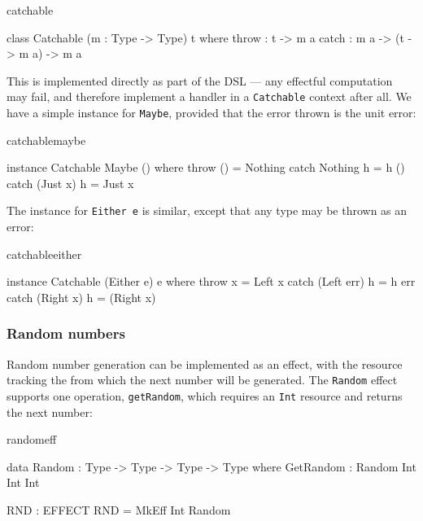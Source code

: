 \begin{SaveVerbatim}{catchable}

class Catchable (m : Type -> Type) t where
    throw : t -> m a
    catch : m a -> (t -> m a) -> m a

\end{SaveVerbatim}

\noindent
This is implemented directly as part of the \Eff{} DSL --- any effectful
computation may fail, and therefore implement a handler in a \texttt{Catchable}
context after all. We have a simple instance for \texttt{Maybe}, provided that
the error thrown is the unit error:

\begin{SaveVerbatim}{catchablemaybe}

instance Catchable Maybe () where
    throw () = Nothing
    catch Nothing  h = h ()
    catch (Just x) h = Just x

\end{SaveVerbatim}

\noindent
The instance for \texttt{Either e} is similar, except that any type may be
thrown as an error:

\begin{SaveVerbatim}{catchableeither}

instance Catchable (Either e) e where
    throw x = Left x
    catch (Left err) h = h err
    catch (Right x)  h = (Right x)

\end{SaveVerbatim}

\subsubsection{Random numbers}

Random number generation can be implemented as an effect, with the resource
tracking the  from which the next number will be generated.
The \texttt{Random} effect supports one operation, \texttt{getRandom}, which
requires an \texttt{Int} resource and returns the next number:

\begin{SaveVerbatim}{randomeff}

data Random : Type -> Type -> Type -> Type where
     GetRandom : Random Int Int Int

RND : EFFECT
RND = MkEff Int Random

\end{SaveVerbatim}

